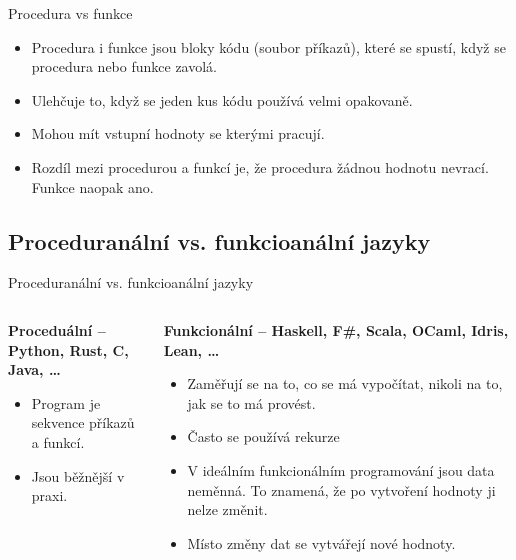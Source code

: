 \documentclass[aspectratio=169,xcolor=dvipsnames, t]{beamer}
\begin{document}
{\begin{frame}{Procedura vs funkce}
    \begin{itemize}
        \item Procedura i funkce jsou bloky kódu (soubor příkazů), které se spustí, když se procedura nebo funkce zavolá.
        \item Ulehčuje to, když se jeden kus kódu používá velmi opakovaně.
        \item Mohou mít vstupní hodnoty se kterými pracují.
        \item Rozdíl mezi procedurou a funkcí je, že procedura žádnou hodnotu nevrací. Funkce naopak ano.
    \end{itemize}
\end{frame}

\subsection{Proceduranální vs. funkcioanální jazyky}
\begin{frame}{Proceduranální vs. funkcioanální jazyky}
    \begin{columns}
        \begin{column}{0.5\textwidth}
            \textbf{Proceduální -- Python, Rust, C, Java, \ldots}
            \begin{itemize}
                \item Program je sekvence příkazů a funkcí.
                \item Jsou běžnější v praxi.
            \end{itemize}
        \end{column}
        \begin{column}{0.5\textwidth}
            \textbf{Funkcionální -- Haskell, F\#, Scala, OCaml, Idris, Lean, \ldots}
            \begin{itemize}
                \item Zaměřují se na to, co se má vypočítat, nikoli na to, jak se to má provést.
                \item Často se používá rekurze
                \item V ideálním funkcionálním programování jsou data neměnná. To znamená, že po vytvoření hodnoty ji nelze změnit.
                \item Místo změny dat se vytvářejí nové hodnoty.
            \end{itemize}
        \end{column}
    \end{columns}
\end{frame}





}
\end{document}
